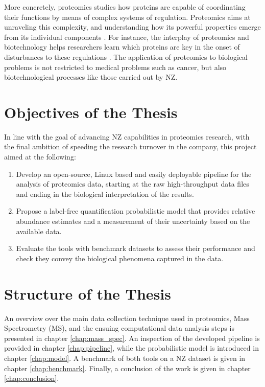 More concretely, proteomics studies how proteins are capable of coordinating their functions by means of complex systems of regulation.  Proteomics aims at unraveling this complexity, and understanding how its powerful properties emerge from its individual components \cite{Milo2002}. For instance, the interplay of proteomics and biotechnology helps researchers learn which proteins are key in the onset of disturbances to these regulations \cite{Saraon2012}. The application of proteomics to biological problems is not restricted to medical problems such as cancer, but also biotechnological processes like those carried out by \ac{NZ}.





\section{Objectives of the Thesis}
\label{sec:objectives}

In line with the goal of advancing \ac{NZ} capabilities in proteomics research, with the final ambition of speeding the research turnover in the company, this project aimed at the following:

\begin{enumerate}

\item Develop an open-source, Linux based and easily deployable pipeline for the analysis of proteomics data, starting at the raw high-throughput data files and ending in the  biological interpretation of the results.

\item Propose a label-free quantification probabilistic model that provides relative abundance estimates and a measurement of their uncertainty based on the available data.


\item Evaluate the tools with benchmark datasets to assess their performance and check they convey the biological phenomena captured in the data.



\end{enumerate}

\section{Structure of the Thesis}

An overview over the main data collection technique used in proteomics, Mass Spectrometry (\ac{MS}), and the ensuing computational data analysis steps is presented in chapter \ref{chap:mass_spec}. An inspection of the developed pipeline is provided in chapter \ref{chap:pipeline}, while the probabilistic model is introduced in chapter \ref{chap:model}. A benchmark of both tools on a \ac{NZ} dataset is given in chapter \ref{chap:benchmark}. Finally, a conclusion of the work is given in chapter \ref{chap:conclusion}.

